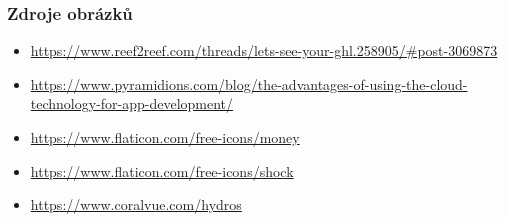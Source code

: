 \documentclass[%
  12pt,       				%
	t,                  %
	aspectratio=1610,   %
	unicode,						%
]{beamer}				    	%
\begin{document}
\begin{frame} [fragile]
	\frametitle{Zdroje obrázků}
	\begin{itemize}
		\item \url{https://www.reef2reef.com/threads/lets-see-your-ghl.258905/#post-3069873}
		\item \url{https://www.pyramidions.com/blog/the-advantages-of-using-the-cloud-technology-for-app-development/}
		\item \url{https://www.flaticon.com/free-icons/money}
		\item \url{https://www.flaticon.com/free-icons/shock}
		\item \url{https://www.coralvue.com/hydros}
	\end{itemize}			
\end{frame}
\end{document}
